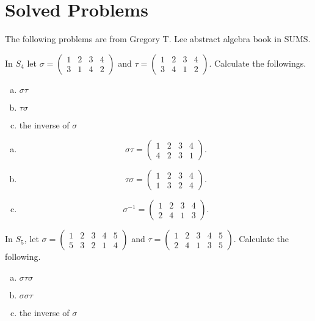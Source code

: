 \section{Solved Problems}
The following problems are from Gregory T. Lee abstract algebra book in SUMS.
\begin{problem}
	In $ S_4 $ let $ \sigma = \begin{pmatrix} 1 & 2 & 3 & 4 \\ 3 & 1 & 4 & 2 \end{pmatrix} $ and $ \tau  = \begin{pmatrix} 1 & 2 & 3 & 4 \\ 3 & 4 & 1 & 2 \end{pmatrix} $. Calculate the followings.
	\begin{enumerate}[(a)]
		\item $ \sigma \tau $
		\item $ \tau\sigma $
		\item the inverse of $ \sigma $
	\end{enumerate}
\end{problem}
\begin{solution}
	\begin{enumerate}[(a)]
		\item 
		\[ \sigma\tau = \begin{pmatrix} 1 & 2 & 3 & 4 \\ 4 & 2 & 3 & 1 \end{pmatrix}. \]
		\item 
		\[ \tau \sigma = \begin{pmatrix} 1 & 2 & 3 & 4 \\ 1 & 3 & 2 & 4 \end{pmatrix}. \]
		\item \[ \sigma^{-1} = \begin{pmatrix} 1 & 2 & 3 & 4 \\ 2 & 4 & 1 & 3 \end{pmatrix}. \]
	\end{enumerate}
\end{solution}

\begin{problem}
	In $ S_5 $, let $ \sigma = \begin{pmatrix} 1 & 2 & 3 & 4 & 5 \\ 5 & 3 & 2 & 1 & 4 \end{pmatrix} $ and $ \tau = \begin{pmatrix} 1 & 2 & 3 & 4 & 5 \\ 2 & 4 & 1 & 3 & 5\end{pmatrix} $. Calculate the following.
	\begin{enumerate}[(a)]
		\item $ \sigma\tau\sigma $
		\item $ \sigma\sigma\tau $
		\item the inverse of $ \sigma $
	\end{enumerate}
\end{problem}

